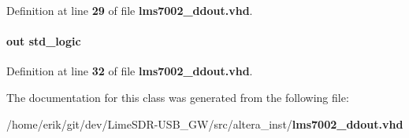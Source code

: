Definition at line {\bf 29} of file {\bf lms7002\+\_\+ddout.\+vhd}.

\paragraph[{txiqsel}]{ {\bfseries \textcolor{keywordflow}{out}\textcolor{vhdlchar}{ }} {\bfseries \textcolor{comment}{std\+\_\+logic}\textcolor{vhdlchar}{ }} \hspace{0.3cm}{\ttfamily [Port]}}\label{classlms7002__ddout_a82b9340bfaddfa8764fafed6322accf2}


Definition at line {\bf 32} of file {\bf lms7002\+\_\+ddout.\+vhd}.



The documentation for this class was generated from the following file\+:\begin{DoxyCompactItemize}
\item 
/home/erik/git/dev/\+Lime\+S\+D\+R-\/\+U\+S\+B\+\_\+\+G\+W/src/altera\+\_\+inst/{\bf lms7002\+\_\+ddout.\+vhd}\end{DoxyCompactItemize}
